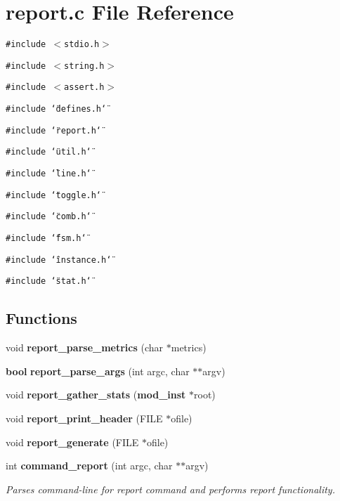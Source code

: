 \section{report.c File Reference}
\label{report_8c}
{\tt \#include $<$stdio.h$>$}\par
{\tt \#include $<$string.h$>$}\par
{\tt \#include $<$assert.h$>$}\par
{\tt \#include \char`\"{}defines.h\char`\"{}}\par
{\tt \#include \char`\"{}report.h\char`\"{}}\par
{\tt \#include \char`\"{}util.h\char`\"{}}\par
{\tt \#include \char`\"{}line.h\char`\"{}}\par
{\tt \#include \char`\"{}toggle.h\char`\"{}}\par
{\tt \#include \char`\"{}comb.h\char`\"{}}\par
{\tt \#include \char`\"{}fsm.h\char`\"{}}\par
{\tt \#include \char`\"{}instance.h\char`\"{}}\par
{\tt \#include \char`\"{}stat.h\char`\"{}}\par
\subsection*{Functions}
\begin{CompactItemize}
\item 
void {\bf report\_\-parse\_\-metrics} (char $\ast$metrics)
\item 
{\bf bool} {\bf report\_\-parse\_\-args} (int argc, char $\ast$$\ast$argv)
\item 
void {\bf report\_\-gather\_\-stats} ({\bf mod\_\-inst} $\ast$root)
\item 
void {\bf report\_\-print\_\-header} (FILE $\ast$ofile)
\item 
void {\bf report\_\-generate} (FILE $\ast$ofile)
\item 
int {\bf command\_\-report} (int argc, char $\ast$$\ast$argv)
\begin{CompactList}\small\item\em Parses command-line for report command and performs report functionality.\item\end{CompactList}\end{CompactItemize}
